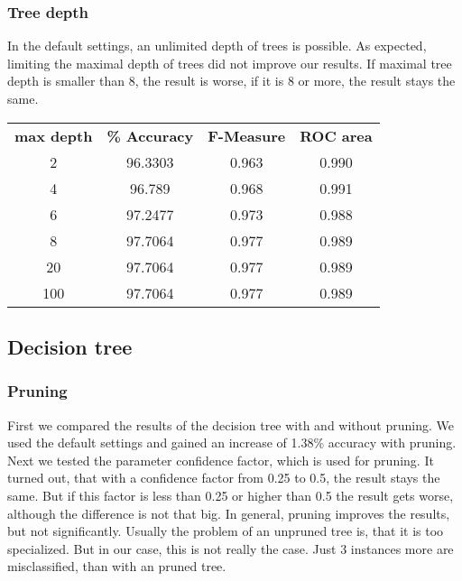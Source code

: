 \documentclass{sig-alternate-05-2015}
\begin{document}
{\subsubsection{Tree depth}
 
In the default settings, an unlimited depth of trees is possible. As expected, limiting the maximal depth of trees did not improve our results. If maximal tree depth is smaller than 8, the result is worse, if it is 8 or more, the result stays the same.
 
\begin{center}
\begin{tabular}{ c | c | c | c }
\textbf{max depth} & \textbf{\% Accuracy} & \textbf{F-Measure} & \textbf{ROC area} \\
2 & 96.3303 & 0.963 & 0.990 \\
4 & 96.789 & 0.968 & 0.991 \\
6 & 97.2477 & 0.973 & 0.988 \\
8 & 97.7064 & 0.977 & 0.989 \\
20 & 97.7064 & 0.977 & 0.989 \\
100 & 97.7064 & 0.977 & 0.989 \\
\end{tabular}
\end{center}
 
\subsection{Decision tree}
 
\subsubsection{Pruning}
 
First we compared the results of the decision tree with and without pruning. We used the default settings and gained an increase of 1.38\% accuracy with pruning. Next we tested the parameter confidence factor, which is used for pruning. It turned out, that with a confidence factor from 0.25 to 0.5, the result stays the same. But if this factor is less than 0.25 or higher than 0.5 the result gets worse, although the difference is not that big. In general, pruning improves the results, but not significantly. Usually the problem of an unpruned tree is, that it is too specialized. But in our case, this is not really the case. Just 3 instances more are misclassified, than with an pruned tree. 
 
}
\end{document}
